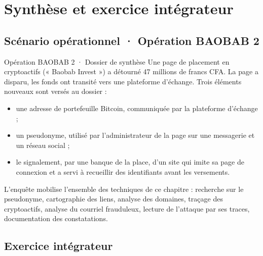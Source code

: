 \section{Synthèse et exercice intégrateur}

\subsection{Scénario opérationnel · Opération BAOBAB 2}

\begin{boxscenario}{Opération BAOBAB 2 · Dossier de synthèse}
Une page de placement en cryptoactifs (« Baobab Invest ») a détourné 47 millions de francs CFA. La page a disparu, les fonds ont transité vers une plateforme d'échange. Trois éléments nouveaux sont versés au dossier :
\begin{itemize}
\item une adresse de portefeuille Bitcoin, communiquée par la plateforme d'échange ;
\item un pseudonyme, utilisé par l'administrateur de la page sur une messagerie et un réseau social ;
\item le signalement, par une banque de la place, d'un site qui imite sa page de connexion et a servi à recueillir des identifiants avant les versements.
\end{itemize}

L'enquête mobilise l'ensemble des techniques de ce chapitre : recherche sur le pseudonyme, cartographie des liens, analyse des domaines, traçage des cryptoactifs, analyse du courriel frauduleux, lecture de l'attaque par ses traces, documentation des constatations.
\end{boxscenario}

\subsection{Exercice intégrateur}

